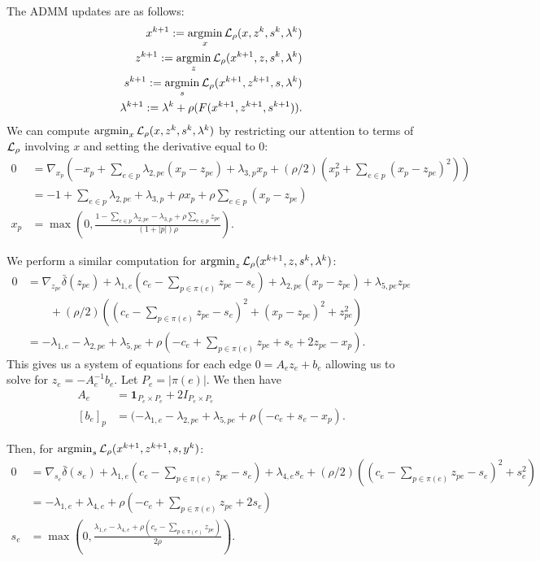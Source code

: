 \documentclass[11pt]{article}
\begin{document}
The ADMM updates are as follows:
\begin{equation}
    \begin{aligned}
        x^{k+1} := \operatorname*{argmin}_{x} \mathcal{L}_\rho(x,z^k,s^{k},\lambda^k)\\
        z^{k+1} := \operatorname*{argmin}_{z} \mathcal{L}_\rho(x^{k+1},z,s^{k},\lambda^k)\\
        s^{k+1} := \operatorname*{argmin}_{s} \mathcal{L}_\rho(x^{k+1},z^{k+1},s,\lambda^k)\\
        \lambda^{k+1} := \lambda^k + \rho(F(x^{k+1},z^{k+1},s^{k+1})).
    \end{aligned}
\end{equation}
We can compute $\operatorname*{argmin}_{x} \mathcal{L}_\rho(x,z^k,s^k,\lambda^k)$ by restricting our
attention to terms of $\mathcal{L}_\rho$ involving $x$ and setting the derivative equal to 0:
\begin{align*}
0
&= \nabla_{x_p}(-x_p + \sum_{e\in p}\lambda_{2,pe}(x_p - z_{pe}) + \lambda_{3,p} x_p
+ (\rho/2)(x_p^2 + \sum_{e \in p}(x_p - z_{pe})^2))\\
&= -1 + \sum_{e \in p}\lambda_{2,pe} + \lambda_{3,p} + \rho x_p + \rho\sum_{e \in p} (x_p - z_{pe})\\
x_p &= \max(0,\frac{1 - \sum_{e \in p}\lambda_{2,pe} - \lambda_{3,p} + \rho \sum_{e\in p} z_{pe}}
{(1 + |p|)\rho}).
\end{align*}

We perform a similar computation for $\operatorname*{argmin}_{z} \mathcal{L}_\rho(x^{k+1},z,s^k,\lambda^k)$:
\begin{align*}
0
&= \nabla_{z_{pe}}\bar\delta(z_{pe}) + \lambda_{1,e}(c_e - \sum_{p\in\pi(e)} z_{pe} - s_{e})
    + \lambda_{2,pe}(x_p - z_{pe}) + \lambda_{5,pe}z_{pe}\\
& \qquad + (\rho/2)((c_e - \sum_{p\in\pi(e)} z_{pe} - s_e)^2 + (x_p - z_{pe})^2 + z_{pe}^2)\\
&= -\lambda_{1,e} - \lambda_{2,pe} + \lambda_{5,pe}
    + \rho(-c_e + \sum_{p\in\pi(e)} z_{pe} + s_e  + 2z_{pe} - x_p).
\end{align*}
This gives us a system of equations for each edge $0 = A_ez_e + b_e$
allowing us to solve for $z_e = -A_e^{-1}b_e$.
Let $P_e= |\pi(e)|$. We then have
\begin{align*}
A_e &= \mathbf{1}_{P_e\times P_e} + 2I_{P_e\times P_e}\\
[b_e]_p &= (-\lambda_{1,e} - \lambda_{2,pe} + \lambda_{5,pe}
    + \rho(-c_e + s_e - x_p).
\end{align*}

Then, for $\operatorname*{argmin}_{s} \mathcal{L}_\rho(x^{k+1},z^{k+1},s,y^k)$:
\begin{align*}
0
&= \nabla_{s_{e}}\bar\delta(s_{e}) + \lambda_{1,e}(c_e - \sum_{p\in\pi(e)} z_{pe} - s_{e})
 + \lambda_{4,e}s_{e}
    + (\rho/2)((c_e - \sum_{p\in\pi(e)} z_{pe} - s_{e})^2 + s_{e}^2)\\
&= -\lambda_{1,e} + \lambda_{4,e} + \rho(-c_e + \sum_{p\in\pi(e)} z_{pe} + 2s_e)\\
s_{e} &= \max(0,\frac{\lambda_{1,e} - \lambda_{4,e} + \rho(c_e - \sum_{p\in\pi(e)}z_{pe})}{2\rho}).
\end{align*}
\end{document}
